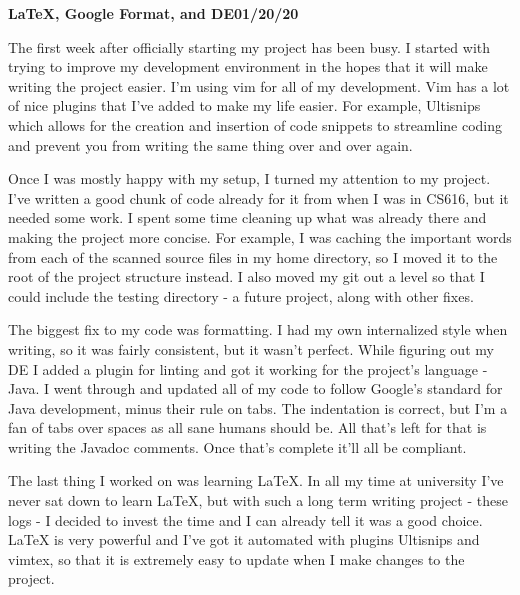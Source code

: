 \documentclass[]{article}
\newenvironment{logentry}[2]%
{\noindent\vspace{.2cm}\large\textbf{#2}\titlerule\large\textbf{#1}}
{\\\\\\\vspace{5cm}}
\begin{document}
\begin{logentry}{01/20/20}{{\LaTeX}, Google Format, and DE}
    \par The first week after officially starting my project has been busy.
    I started with trying to improve my development environment in the 
    hopes that it will make writing the project easier.  I'm using vim
    for all of my development.  Vim has a lot of nice plugins that I've 
    added to make my life easier.  For example, Ultisnips which allows
    for the creation and insertion of code snippets to streamline
    coding and prevent you from writing the same thing over and
    over again.
    \par Once I was mostly happy with my setup, I turned my attention
    to my project.  I've written a good chunk of code already for it
    from when I was in CS616, but it needed some work.  I spent some
    time cleaning up what was already there and making the project more
    concise.  For example, I was caching the important words from each of 
    the scanned source files in my home directory, so I moved it to the root
    of the project structure instead.  I also moved my git out a level so that
    I could include the testing directory - a future project, along with other
    fixes.
    \par The biggest fix to my code was formatting.  I had my own internalized 
    style when writing, so it was fairly consistent, but it wasn't perfect.
    While figuring out my DE I added a plugin for linting and got it working
    for the project's language - Java.  I went through and updated all of my
    code to follow Google's standard for Java development, minus their rule
    on tabs.  The indentation is correct, but I'm a fan of tabs over spaces 
    as all sane humans should be.  All that's left for that is writing the
    Javadoc comments.  Once that's complete it'll all be compliant.
    \par The last thing I worked on was learning {\LaTeX}. In all my
    time at university I've never sat down to learn {\LaTeX}, but with
    such a long term writing project - these logs - I decided
    to invest the time and I can already tell it was a good choice.
    {\LaTeX} is very powerful and I've got it automated with plugins 
    Ultisnips and vimtex, so that it is extremely easy to update when I make 
    changes to the project.
\end{logentry}
\end{document}
